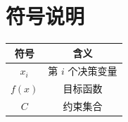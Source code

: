 \section{符号说明}

\begin{center}
\begin{tabular}{cc}
\toprule
符号 & 含义 \\
\midrule
$x_i$ & 第 $i$ 个决策变量 \\
$f(x)$ & 目标函数 \\
$C$ & 约束集合 \\
\bottomrule
\end{tabular}
\end{center}


